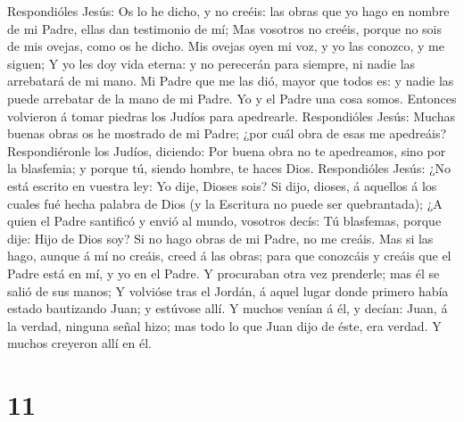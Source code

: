 Respondióles Jesús: Os lo he dicho, y no creéis: las obras que yo hago
en nombre de mi Padre, ellas dan testimonio de mí;  Mas
vosotros no creéis, porque no sois de mis ovejas, como os he dicho.
 Mis ovejas oyen mi voz, y yo las conozco, y me siguen;
 Y yo les doy vida eterna: y no perecerán para siempre, ni
nadie las arrebatará de mi mano.  Mi Padre que me las dió,
mayor que todos es: y nadie las puede arrebatar de la mano de mi Padre.
 Yo y el Padre una cosa somos.  Entonces
volvieron á tomar piedras los Judíos para apedrearle. 
Respondióles Jesús: Muchas buenas obras os he mostrado de mi Padre; ¿por
cuál obra de esas me apedreáis?  Respondiéronle los Judíos,
diciendo: Por buena obra no te apedreamos, sino por la blasfemia; y
porque tú, siendo hombre, te haces Dios.  Respondióles
Jesús: ¿No está escrito en vuestra ley: Yo dije, Dioses sois?
 Si dijo, dioses, á aquellos á los cuales fué hecha palabra
de Dios (y la Escritura no puede ser quebrantada);  ¿A
quien el Padre santificó y envió al mundo, vosotros decís: Tú blasfemas,
porque dije: Hijo de Dios soy?  Si no hago obras de mi
Padre, no me creáis.  Mas si las hago, aunque á mí no
creáis, creed á las obras; para que conozcáis y creáis que el Padre está
en mí, y yo en el Padre.  Y procuraban otra vez prenderle;
mas él se salió de sus manos;  Y volvióse tras el Jordán, á
aquel lugar donde primero había estado bautizando Juan; y estúvose allí.
 Y muchos venían á él, y decían: Juan, á la verdad, ninguna
señal hizo; mas todo lo que Juan dijo de éste, era verdad. 
Y muchos creyeron allí en él.

\hypertarget{section-10}{%
\section{11}\label{section-10}}

